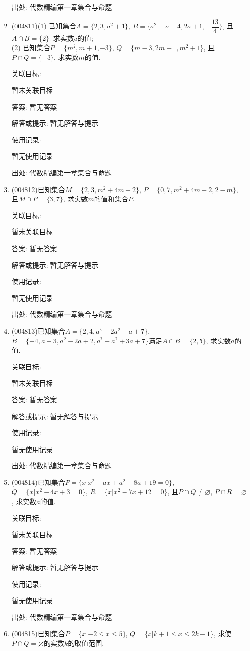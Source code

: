 \documentclass[10pt,a4paper]{article}
\begin{document}
\begin{enumerate}[1.]
出处: 代数精编第一章集合与命题
\item { (004811)}(1) 已知集合$A=\{2,3,a^2+1\}$, $B=\{a^2+a-4,2a+1,-\dfrac{13}4\}$, 且$A\cap B=\{2\}$, 求实数$a$的值;\\
(2) 已知集合$P=\{m^2,m+1,-3\}$, $Q=\{m-3,2m-1,m^2+1\}$, 且$P\cap Q=\{-3\}$, 求实数$m$的值.


关联目标:

暂未关联目标

答案: 暂无答案

解答或提示: 暂无解答与提示

使用记录:

暂无使用记录


出处: 代数精编第一章集合与命题
\item { (004812)}已知集合$M=\{2,3,m^2+4m+2\}$, $P=\{0,7,m^2+4m-2,2-m\}$, 且$M\cap P=\{3,7\}$, 求实数$m$的值和集合$P$.


关联目标:

暂未关联目标

答案: 暂无答案

解答或提示: 暂无解答与提示

使用记录:

暂无使用记录


出处: 代数精编第一章集合与命题
\item { (004813)}已知集合$A=\{2,4,a^3-2a^2-a+7\}$, $B=\{-4,a-3,a^2-2a+2,a^3+a^2+3a+7\}$满足$A\cap B=\{2,5\}$, 求实数$a$的值.


关联目标:

暂未关联目标

答案: 暂无答案

解答或提示: 暂无解答与提示

使用记录:

暂无使用记录


出处: 代数精编第一章集合与命题
\item { (004814)}已知集合$P=\{x|x^2-ax+a^2-8a+19=0\}$, $Q=\{x|x^2-4x+3=0\}$, $R=\{x|x^2-7x+12=0\}$, 且$P\cap Q\ne \varnothing$, $P\cap R=\varnothing$, 求实数$a$的值.


关联目标:

暂未关联目标

答案: 暂无答案

解答或提示: 暂无解答与提示

使用记录:

暂无使用记录


出处: 代数精编第一章集合与命题
\item { (004815)}已知集合$P=\{x|-2\le x\le 5\}$, $Q=\{x|k+1\le x\le 2k-1\}$, 求使$P\cap Q=\varnothing$的实数$k$的取值范围.



\end{enumerate}
\end{document}
